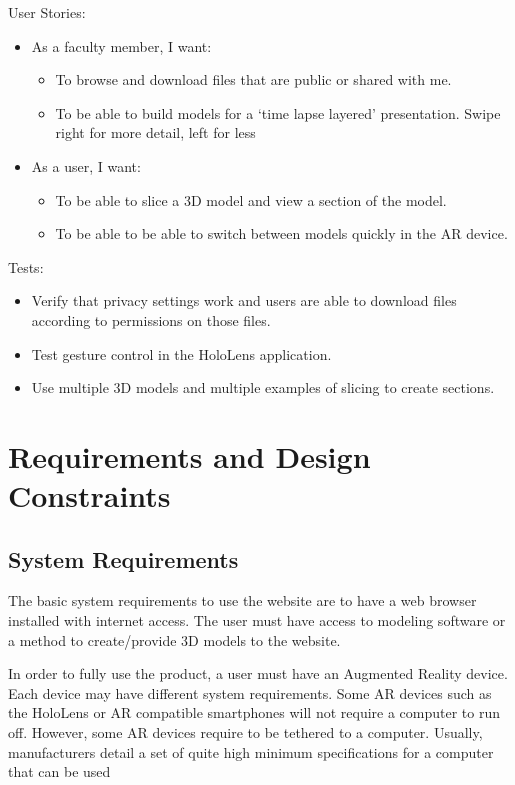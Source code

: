User Stories:
\begin{itemize}
	\item As a faculty member, I want:
	\begin{itemize}
		\item To browse and download files that are public or shared with me.
		\item To be able to build models for a ‘time lapse layered’ 
		presentation. Swipe right for more detail, left for less
	\end{itemize}
	\item As a user, I want: 
	\begin{itemize}
		\item To be able to slice a 3D model and view a section of the model.
		\item To be able to be able to switch between models quickly in the AR 
		device.
	\end{itemize}
\end{itemize}
Tests:
\begin{itemize}
	\item Verify that privacy settings work and users are able to download files
	according to permissions on those files.
	\item Test gesture control in the HoloLens application.
	\item Use multiple 3D models and multiple examples of slicing to create 
	sections.
\end{itemize}


\section{Requirements and Design Constraints}


\subsection{System Requirements}

The basic system requirements to use the website are to have a web browser 
installed with internet access.  The user must have access to modeling software 
or a method to create/provide 3D models to the website.

In order to fully use the product, a user must have an Augmented Reality device.
Each device may have different system requirements. Some AR devices such as the 
HoloLens or AR compatible smartphones will not require a computer to run off. 
However, some AR devices require to be tethered to a computer. Usually, 
manufacturers detail a set of quite high minimum specifications for a computer 
that can be used

